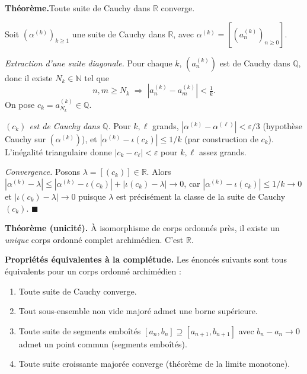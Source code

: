 \begin{mdframed}[style=proofbar]
  \textbf{Théorème.}\enspace Toute suite de Cauchy dans $\mathbb{R}$ converge.

  \medskip
  Soit $(\alpha^{(k)})_{k\geq 1}$ une suite de Cauchy dans $\mathbb{R}$,
  avec $\alpha^{(k)} = [(a_n^{(k)})_{n\geq 0}]$.

  \textit{Extraction d'une suite diagonale.}
  Pour chaque $k$, $(a_n^{(k)})$ est de Cauchy dans $\mathbb{Q}$, donc
  il existe $N_k \in \mathbb{N}$ tel que
  \[
    n, m \geq N_k \;\Rightarrow\; |a_n^{(k)} - a_m^{(k)}| < \tfrac{1}{k}.
  \]
  On pose $c_k = a_{N_k}^{(k)} \in \mathbb{Q}$.

  \textit{$(c_k)$ est de Cauchy dans $\mathbb{Q}$.}
  Pour $k, \ell$ grands, $|\alpha^{(k)} - \alpha^{(\ell)}| < \varepsilon/3$
  (hypothèse Cauchy sur $(\alpha^{(k)})$), et $|\alpha^{(k)} - \iota(c_k)| \leq 1/k$
  (par construction de $c_k$). L'inégalité triangulaire donne $|c_k - c_\ell| < \varepsilon$
  pour $k, \ell$ assez grands.

  \textit{Convergence.} Posons $\lambda = [(c_k)] \in \mathbb{R}$.
  Alors $|\alpha^{(k)} - \lambda| \leq |\alpha^{(k)} - \iota(c_k)| + |\iota(c_k) - \lambda| \to 0$,
  car $|\alpha^{(k)} - \iota(c_k)| \leq 1/k \to 0$ et $|\iota(c_k) - \lambda|\to 0$
  puisque $\lambda$ est précisément la classe de la suite de Cauchy $(c_k)$.
  \hfill$\blacksquare$
\end{mdframed}

\decsep{}


\begin{tcolorbox}[thmbox]
  \textbf{Théorème (unicité).}\enspace%
  À isomorphisme de corps ordonnés près, il existe un \emph{unique} corps ordonné
  complet archimédien. C'est $\mathbb{R}$.

  \medskip
  \textbf{Propriétés équivalentes à la complétude.}
  Les énoncés suivants sont tous équivalents pour un corps ordonné archimédien :
  \begin{enumerate}
    \item Toute suite de Cauchy converge.
    \item Tout sous-ensemble non vide majoré admet une borne supérieure.
    \item Toute suite de segments emboîtés $[a_n, b_n] \supseteq [a_{n+1}, b_{n+1}]$
          avec $b_n-a_n\to 0$ admet un point commun (segments emboîtés).
    \item Toute suite croissante majorée converge (théorème de la limite monotone).
  \end{enumerate}
\end{tcolorbox}

